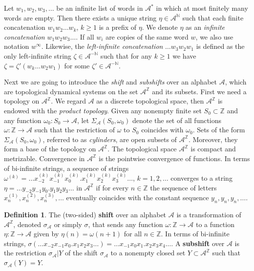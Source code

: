\documentclass[12pt]{article}
\theoremstyle{definition}
\newtheorem{definition}[theorem]{Definition}
\def\bN{\mathbb{N}}
\def\bZ{\mathbb{Z}}
\def\cA{\mathcal{A}}
\def\om{\omega}
\def\si{\sigma}
\begin{document}
Let $w_1,w_2,w_3,\dots$ be an infinite list of words in $\cA^*$ in which at 
most finitely many words are empty.  Then there exists a unique string 
$\eta\in\cA^{\bN}$ such that each finite concatenation $w_1w_2\ldots w_k$, 
$k\ge1$ is a prefix of $\eta$.  We denote $\eta$ as an \emph{infinite 
concatenation} $w_1w_2w_3\ldots$.  If all $w_i$ are copies of the same word 
$w$, we also use notation $w^\infty$.  Likewise, the \emph{left-infinite 
concatenation} $\ldots w_3w_2w_1$ is defined as the only left-infinite 
string $\zeta\in\cA^{-\bN}$ such that for any $k\ge1$ we have 
$\zeta=\zeta'(w_k\ldots w_2w_1)$ for some $\zeta'\in\cA^{-\bN}$.  

Next we are going to introduce the \emph{shift} and \emph{subshifts} over 
an alphabet $\cA$, which are topological dynamical systems on the set 
$\cA^{\bZ}$ and its subsets.  First we need a topology on $\cA^{\bZ}$.  We 
regard $\cA$ as a discrete topological space, then $\cA^{\bZ}$ is endowed 
with the \emph{product topology}.  Given any nonempty finite set 
$S_0\subset\bZ$ and any function $\om_0:S_0\to\cA$, let 
$\Sigma_{\cA}(S_0,\om_0)$ denote the set of all functions $\om:\bZ\to\cA$ 
such that the restriction of $\om$ to $S_0$ coincides with $\om_0$.  Sets 
of the form $\Sigma_{\cA}(S_0,\om_0)$, referred to as \emph{cylinders}, are 
open subsets of $\cA^{\bZ}$.  Moreover, they form a base of the topology on 
$\cA^{\bZ}$.  The topological space $\cA^{\bZ}$ is compact and metrizable.  
Convergence in $\cA^{\bZ}$ is the pointwise convergence of functions.  In 
terms of bi-infinite strings, a sequence of strings $\om^{(k)}=\ldots 
x^{(k)}_{-2}x^{(k)}_{-1}x^{(k)}_0.x^{(k)}_1x^{(k)}_2x^{(k)}_3\ldots$, 
$k=1,2,\dots$ converges to a string $\eta=\ldots 
y_{-2}y_{-1}y_0.y_1y_2y_3\ldots$ in $\cA^{\bZ}$ if for every $n\in\bZ$ the 
sequence of letters $x^{(1)}_n,x^{(2)}_n,x^{(3)}_n,\dots$ eventually 
coincides with the constant sequence $y_n,y_n,y_n,\dots$.

\begin{definition}\label{def-shift}
The (two-sided) \textbf{shift} over an alphabet $\cA$ is a transformation 
of $\cA^{\bZ}$, denoted $\si_{\cA}$ or simply $\si$, that sends any 
function $\om:\bZ\to\cA$ to a function $\eta:\bZ\to\cA$ given by 
$\eta(n)=\om(n+1)$ for all $n\in\bZ$.  In terms of bi-infinite strings, 
$\si(\ldots x_{-2}x_{-1}x_0.x_1x_2x_3\ldots)=\ldots x_{-1}x_0x_1.x_2x_3x_4
\ldots$.  A \textbf{subshift} over $\cA$ is the restriction $\si_{\cA}|Y$ 
of the shift $\si_{\cA}$ to a nonempty closed set $Y\subset\cA^{\bZ}$ such 
that $\si_{\cA}(Y)=Y$.  
\end{definition}
\end{document}
